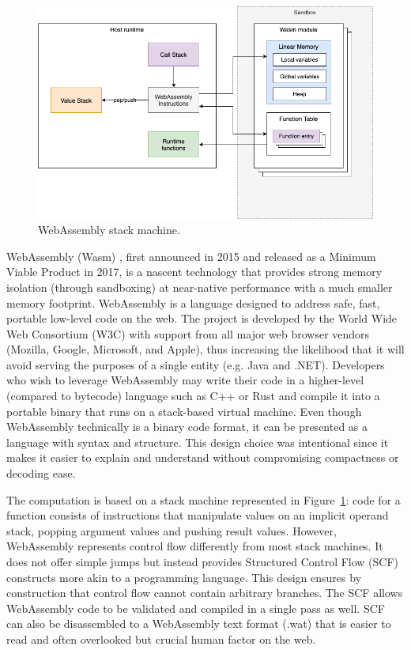 \begin{figure}[ht]
\centering
\includegraphics[width=\columnwidth]{figures/webassembly}
\caption{WebAssembly stack machine.} \label{fig:webassembly}
\end{figure}

WebAssembly (Wasm) \cite{haas2017bringing}, first announced in 2015 and released as a Minimum Viable Product in 2017, is a nascent technology that provides strong memory isolation (through sandboxing) at near-native performance with a much smaller memory footprint. WebAssembly is a language designed to address safe, fast, portable low-level code on the web. The project is developed by the World Wide Web Consortium (W3C) with support from all major web browser vendors (Mozilla, Google, Microsoft, and Apple), thus increasing the likelihood that it will avoid serving the purposes of a single entity (e.g. Java and .NET). Developers who wish to leverage WebAssembly may write their code in a higher-level (compared to bytecode) language such as C++ or Rust and compile it into a portable binary that runs on a stack-based virtual machine. Even though WebAssembly technically is a binary code format, it can be presented as a language with syntax and structure. This design choice was intentional since it makes it easier to explain and understand without compromising compactness or decoding ease.


The computation is based on a stack machine represented in Figure~\ref{fig:webassembly}: code for a function consists of instructions that manipulate values on an implicit operand stack, popping argument values and pushing result values. However, WebAssembly represents control flow differently from most stack machines. It does not offer simple jumps but instead provides Structured Control Flow (SCF) constructs more akin to a programming language. This design ensures by construction that control flow cannot contain arbitrary branches. The SCF allows WebAssembly code to be validated and compiled in a single pass as well. SCF can also be disassembled to a WebAssembly text format (.wat) that is easier to read and often overlooked but crucial human factor on the web.

